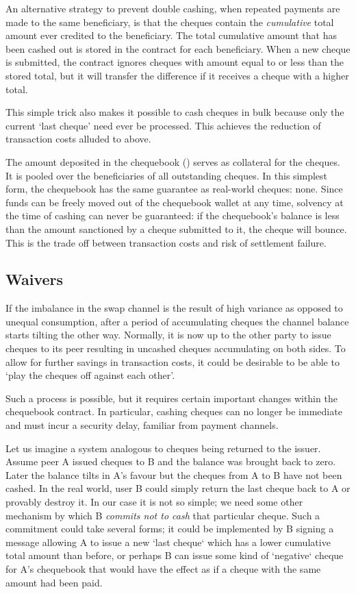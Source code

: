 An alternative strategy to prevent double cashing, when repeated payments are made to the same beneficiary, is that the cheques contain the \emph{cumulative} total amount ever credited to the beneficiary. The total cumulative amount that has been cashed out is stored in the contract for each beneficiary. When a new cheque is submitted, the contract ignores cheques with amount equal to or less than the stored total, but it will transfer the difference if it receives a cheque with a higher total.


This simple trick also makes it possible to cash cheques in bulk because only the current `last cheque' need ever be processed. This achieves the reduction of transaction costs alluded to above.

The amount deposited in the chequebook () serves as collateral for the cheques. It is pooled over the beneficiaries of all outstanding cheques. In this simplest form, the chequebook has the same guarantee as real-world cheques: none. Since funds can be freely moved out of the chequebook wallet at any time, solvency at the time of cashing can never be guaranteed: if the chequebook's balance is less than the amount sanctioned by a cheque submitted to it, the cheque will bounce. This is the trade off between transaction costs and risk of settlement failure.

\subsection{Waivers}\label{sec:waiver}

If the imbalance in the swap channel is the result of high variance as opposed to unequal consumption, after a period of accumulating cheques the channel balance starts tilting the other way. Normally, it is now up to the other party to issue cheques to its peer resulting in uncashed cheques accumulating on both sides.
To allow for further savings in transaction costs, it could be desirable to be able to `play the cheques off against each other'.

Such a process is possible, but it requires certain important changes within the chequebook contract. In particular, cashing cheques can no longer be immediate and must incur a security delay, familiar from payment channels.

Let us imagine a system analogous to cheques being returned to the issuer. Assume peer A issued cheques to B and the balance was brought back to zero. Later the balance tilts in A's favour but the cheques from A to B have not been cashed. In the real world, user B could simply return the last cheque back to A or provably destroy it. In our case it is not so simple; we need some other mechanism by which B  \emph{commits not to cash} that particular cheque. Such a commitment could take several forms; it could be implemented by B signing a message allowing A to issue a new `last cheque` which has a lower cumulative total amount than before, or perhaps B can issue some kind of `negative` cheque for A's chequebook that would have the effect as if a cheque with the same amount had been paid. 

